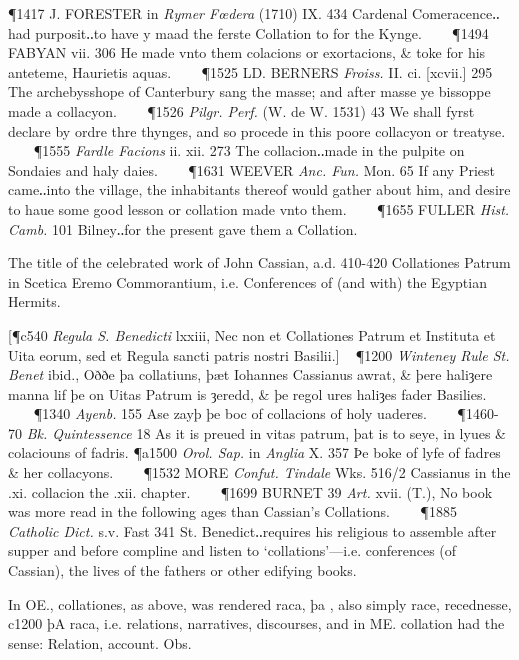\begin{description}[wide, labelwidth=!, labelindent=0pt]
\begin{myenumerate}
\P 1417 J. FORESTER in \textit{Rymer Fœdera} (1710) IX. 434 Cardenal Comeracence‥had purposit‥to have y maad the ferste Collation to for the Kynge.    
\P 1494 FABYAN vii. 306 He made vnto them colacions or exortacions, \& toke for his anteteme, Haurietis aquas.    
\P 1525 LD. BERNERS  \textit{Froiss.} II. ci. [xcvii.] 295 The archebysshope of Canterbury sang the masse; and after masse ye bissoppe made a collacyon.    
\P 1526 \textit{Pilgr.  Perf.} (W. de W. 1531) 43 We shall fyrst declare by ordre thre thynges, and so procede in this poore collacyon or treatyse.    
\P 1555 \textit{Fardle  Facions} ii. xii. 273 The collacion‥made in the pulpite on Sondaies and haly daies.    
\P 1631 WEEVER  \textit{Anc. Fun.} Mon. 65 If any Priest came‥into the village, the inhabitants thereof would gather about him, and desire to haue some good lesson or collation made vnto them.    
\P 1655 FULLER  \textit{Hist. Camb.} 101 Bilney‥for the present gave them a Collation.

 The title of the celebrated work of John Cassian, a.d. 410-420 Collationes Patrum in Scetica Eremo Commorantium, i.e. Conferences of (and with) the Egyptian Hermits.

[\P c540 \textit{Regula S. Benedicti} lxxiii, Nec non et Collationes Patrum et Instituta et Uita eorum, sed et Regula sancti patris nostri Basilii.]  
\P 1200 \textit{Winteney  Rule St. Benet} ibid., Oððe þa collatiuns, þæt Iohannes Cassianus awrat, \& þere haliȝere manna lif þe on Uitas Patrum is ȝeredd, \& þe regol ures haliȝes fader Basilies.    
\P 1340  \textit{Ayenb.} 155 Ase zayþ þe boc of collacions of holy uaderes.    
\P 1460-70  \textit{Bk. Quintessence} 18 As it is preued in vitas patrum, þat is to seye, in lyues \& colaciouns of fadris.
\P a1500 \textit{Orol.  Sap.} in \textit{Anglia} X. 357 Þe boke of lyfe of fadres \& her collacyons.    
\P 1532 MORE  \textit{Confut. Tindale} Wks. 516/2 Cassianus in the .xi. collacion the .xii. chapter.    
\P 1699 BURNET 39 \textit{Art.} xvii. (T.), No book was more read in the following ages than Cassian's Collations.    
\P 1885 \textit{Catholic  Dict.} s.v. Fast 341 St. Benedict‥requires his religious to assemble after supper and before compline and listen to ‘collations’—i.e. conferences (of Cassian), the lives of the fathers or other edifying books.

 In OE., collationes, as above, was rendered  raca, þa , also simply race, recednesse, 
c1200 þA  raca, i.e. relations, narratives, discourses, and in ME. collation had the sense: Relation, account. Obs.


\end{myenumerate}
\end{description}
